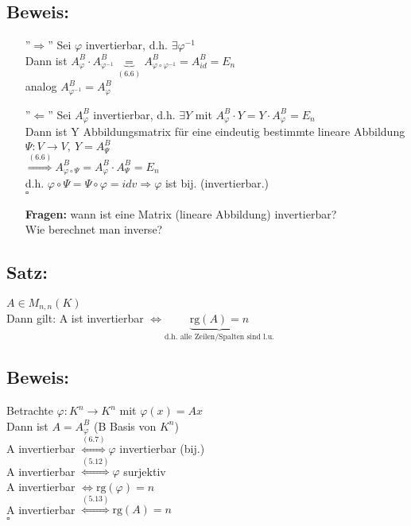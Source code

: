 \subsection*{Beweis:}
\begin{enumerate}
	\item[''$\Rightarrow$'']
	Sei $\varphi$ invertierbar, d.h. $\exists \varphi^{-1}$\\
	Dann ist $A_{\varphi}^B\cdot A_{\varphi^{-1}}^B \underbrace{=}_{(6.6)} A_{\varphi\circ\varphi^{-1}}^B = A_{id}^B = E_n$\\
	analog $A_{\varphi^{-1}}^B=A_{\varphi}^B$
	
	\item[''$\Leftarrow$'']
	Sei $A_{\varphi}^B$ invertierbar, d.h. $\exists Y$ mit $A_{\varphi}^B\cdot Y=Y\cdot A_{\varphi}^B = E_n$\\
	Dann ist Y Abbildungsmatrix für eine eindeutig bestimmte lineare Abbildung $\Psi: V\rightarrow V,  \ Y=A_{\Psi}^B$\\
	$\stackrel{(6.6)}{\Rightarrow} A_{\varphi\circ\Psi}^B = A_{\varphi}^B\cdot A_{\Psi}^B = E_n$\\
	d.h. $\varphi\circ\Psi=\Psi\circ\varphi=idv \Rightarrow \varphi$ ist bij. (invertierbar.)\\
	\hspace*{13cm}$\square$
	
	\textbf{Fragen:} wann ist eine Matrix (lineare Abbildung) invertierbar?\\
	Wie berechnet man inverse?
\end{enumerate}

\subsection{Satz:}
$A\in M_{n,n}(K)$\\
Dann gilt: A ist invertierbar $\Leftrightarrow \underbrace{\mathrm{rg}(A)=n}_{\text{d.h. alle Zeilen/Spalten sind l.u.}}$

\subsection*{Beweis:}
Betrachte $\varphi: K^n\rightarrow K^n$ mit $\varphi(x)=Ax$\\
Dann ist $A = A_{\varphi}^B$ (B Basis von $K^n$)\\
A invertierbar $\stackrel{(6.7)}{\Leftrightarrow} \varphi$ invertierbar (bij.)\\
A invertierbar $\stackrel{(5.12)}{\Leftrightarrow} \varphi$ surjektiv\\
A invertierbar $\Leftrightarrow \mathrm{rg}(\varphi)=n$\\
A invertierbar $\stackrel{(5.13)}{\Leftrightarrow} \mathrm{rg}(A)=n$\\
\hspace*{13cm}$\square$

